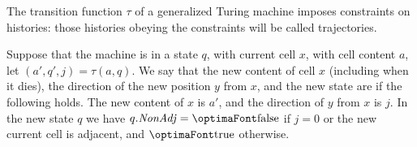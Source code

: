 \documentclass[12pt]{memoir}
\newcommand{\fld}[1]{\ensuremath{\textit{#1\/}}}
\newcommand{\NonAdj}{\fld{NonAdj}}
\begin{document}
The transition function \( \tau \) of a generalized Turing machine
imposes constraints on histories: those
histories obeying the constraints will be called trajectories.

\begin{definition}
Suppose that the machine is in a state \( q \), with current cell \( x \), 
with cell content \( a \), let \( (a',q',j) = \tau(a,q) \).
We say that the new content of cell \( x \) (including when it dies),
the direction of the new position \( y \) from \( x \),
and the new state are  if
the following holds.
The new content of \( x \) is \( a' \), and
the direction of \( y \) from \( x \) is \( j \).
In the new state \( q \) we have \( q.\NonAdj=\false \)
if \( j=0 \) or the new current cell is adjacent, and \( \true \) otherwise.  
\end{definition}
\end{document}
